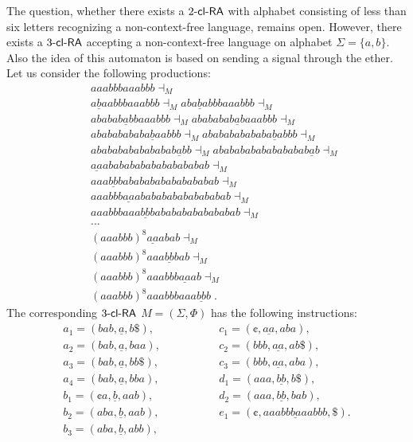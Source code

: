 The question, whether there exists a $\kclRA[2]$ with alphabet consisting of less than six letters recognizing a non-context-free language, remains open. However, there exists a $\kclRA[3]$ accepting a non-context-free language on alphabet $\Sigma = \{a, b\}$. Also the idea of this automaton is based on sending a signal through the ether. Let us consider the following productions:
\begin{eqnarray*}
& & aaabbbaaabbb \dashv_M\\
& & a\underline{b}aabbbaaabbb \dashv_M
aba\underline{b}abbbaaabbb \dashv_M\\
& & ababab\underline{a}bbaaabbb \dashv_M
abababab\underline{a}baaabbb \dashv_M\\
& & abababababa\underline{b}aabbb \dashv_M
ababababababa\underline{b}abbb \dashv_M\\
& & abababababababab\underline{a}bb \dashv_M
ababababababababab\underline{a}b \dashv_M\\
& & \underline{aa}abababababababababab \dashv_M\\
& & aaa\underline{bb}bababababababababab \dashv_M\\
& & aaabbb\underline{aa}ababababababababab \dashv_M\\
& & aaabbbaaa\underline{bb}babababababababab \dashv_M\\
& & \ldots\\
& & (aaabbb)^{8}\underline{aa}abab \dashv_M\\
& & (aaabbb)^{8}aaa\underline{bb}bab \dashv_M\\
& & (aaabbb)^{8}aaabbb\underline{aa}ab \dashv_M\\
& & (aaabbb)^{8}aaabbbaaa\underline{bb}b\;.
\end{eqnarray*}
The corresponding $\kclRA[3]$ $M = (\Sigma, \Phi)$ has the following instructions:
$$
\begin{array}{ll}
a_1 = (bab, \underline{a}, b\$),\hspace{5em}    & c_1 = (\cent, \underline{aa}, aba),\\
a_2 = (bab, \underline{a}, baa) ,               & c_2 = (bbb, \underline{aa}, ab\$),\\
a_3 = (bab, \underline{a}, bb\$),               & c_3 = (bbb, \underline{aa}, aba),\\
a_4 = (bab, \underline{a}, bba),                & d_1 = (aaa, \underline{bb}, b\$),\\
b_1 = (\cent a, \underline{b}, aab),            & d_2 = (aaa, \underline{bb}, bab),\\
b_2 = (aba, \underline{b}, aab),                & e_1 = (\cent, \underline{aaabbbaaabbb}, \$).\\
b_3 = (aba, \underline{b}, abb),
\end{array}
$$
